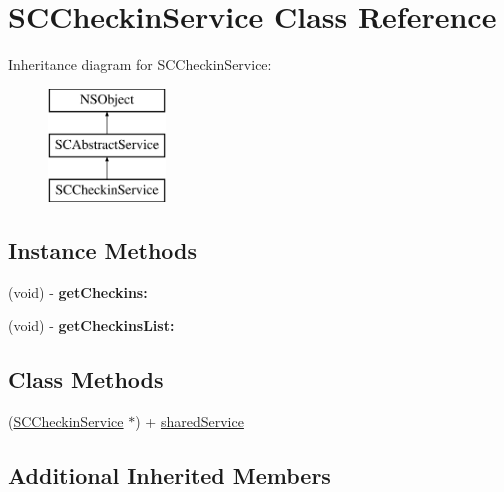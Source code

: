 \hypertarget{interface_s_c_checkin_service}{}\section{S\+C\+Checkin\+Service Class Reference}
\label{interface_s_c_checkin_service}
Inheritance diagram for S\+C\+Checkin\+Service\+:\begin{figure}[H]
\begin{center}
\leavevmode
\includegraphics[height=3.000000cm]{interface_s_c_checkin_service}
\end{center}
\end{figure}
\subsection*{Instance Methods}
\begin{DoxyCompactItemize}
\item 
(void) -\/ {\bfseries get\+Checkins\+:}\hypertarget{interface_s_c_checkin_service_acd582366c85727d8b7b35239aa7a7276}{}\label{interface_s_c_checkin_service_acd582366c85727d8b7b35239aa7a7276}

\item 
(void) -\/ {\bfseries get\+Checkins\+List\+:}\hypertarget{interface_s_c_checkin_service_aba79a46c426b4a81c693f4010cccc64a}{}\label{interface_s_c_checkin_service_aba79a46c426b4a81c693f4010cccc64a}

\end{DoxyCompactItemize}
\subsection*{Class Methods}
\begin{DoxyCompactItemize}
\item 
(\hyperlink{interface_s_c_checkin_service}{S\+C\+Checkin\+Service} $\ast$) + \hyperlink{interface_s_c_checkin_service_a3aa497074aad62b31c5103fa904787a6}{shared\+Service}
\end{DoxyCompactItemize}
\subsection*{Additional Inherited Members}


